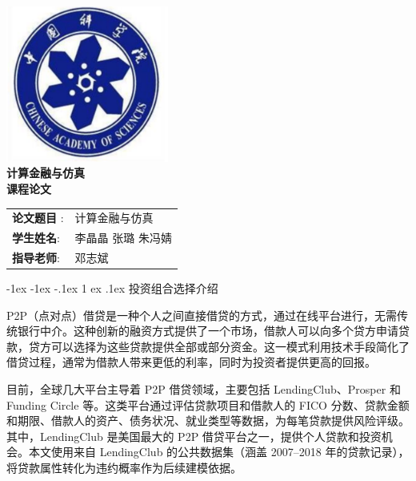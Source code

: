 \documentclass[12pt,nonblindrev]{write_paper}
\makeatletter
\renewcommand\section{\@startsection {section}{1}{\z@}%
                                   {-1ex \@plus -1ex \@minus -.1ex}%
                                   {1 ex \@plus.1ex}%
                                   {\normalfont\large\bfseries}}
\makeatother
\begin{document}
\vspace*{\fill}

\begin{center}

    \includegraphics[width=0.4\textwidth]{Figures/校徽.png}\\[1cm]
       \Huge \bfseries
       \textbf{计算金融与仿真}\\[0.5cm]
       \Huge \bfseries
       \textbf{课程论文}\\[2cm]
    
    \Large
    \begin{table}[htbp]
    \centering
    \Large
    \begin{tabular}{ll}
    \textbf{论文题目 }: & 计算金融与仿真 \\
    \textbf{学生姓名}: & 李晶晶 \quad 张璐 \quad 朱冯婧 \\
    \textbf{指导老师}: & 邓志斌 
    \end{tabular}
    \end{table}

    


\end{center}

\vspace*{\fill}
\newpage





\section{投资组合选择介绍}


P2P（点对点）借贷是一种个人之间直接借贷的方式，通过在线平台进行，无需传统银行中介。这种创新的融资方式提供了一个市场，借款人可以向多个贷方申请贷款，贷方可以选择为这些贷款提供全部或部分资金。这一模式利用技术手段简化了借贷过程，通常为借款人带来更低的利率，同时为投资者提供更高的回报。

目前，全球几大平台主导着 P2P 借贷领域，主要包括 LendingClub、Prosper 和 Funding Circle 等。这类平台通过评估贷款项目和借款人的 FICO 分数、贷款金额和期限、借款人的资产、债务状况、就业类型等数据，为每笔贷款提供风险评级。其中，LendingClub 是美国最大的 P2P 借贷平台之一，提供个人贷款和投资机会。本文使用来自 LendingClub 的公共数据集（涵盖 2007--2018 年的贷款记录），将贷款属性转化为违约概率作为后续建模依据。
\end{document}
